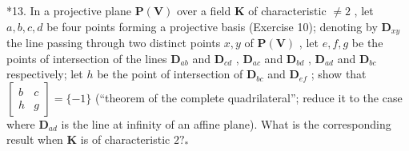 *13. In a projective plane \(\mathbf{P}(\mathbf{V})\) over a field \(\mathbf{K}\) of characteristic \(\neq 2\) , let \(a, b, c, d\) be four points forming a projective basis (Exercise 10); denoting by \(\mathbf{D}_{xy}\) the line passing through two distinct points \(x, y\) of \(\mathbf{P}(\mathbf{V})\) , let \(e, f, g\) be the points of intersection of the lines \(\mathbf{D}_{ab}\) and \(\mathbf{D}_{cd}\) , \(\mathbf{D}_{ac}\) and \(\mathbf{D}_{bd}\) , \(\mathbf{D}_{ad}\) and \(\mathbf{D}_{bc}\) respectively; let \(h\) be the point of intersection of \(\mathbf{D}_{bc}\) and \(\mathbf{D}_{ef}\) ; show that \(\begin{bmatrix} b & c \\ h & g \end{bmatrix} = \{-1\}\) (``theorem of the complete quadrilateral''; reduce it to the case where \(\mathbf{D}_{ad}\) is the line at infinity of an affine plane). What is the corresponding result when \(\mathbf{K}\) is of characteristic \(2?_{*}\)


